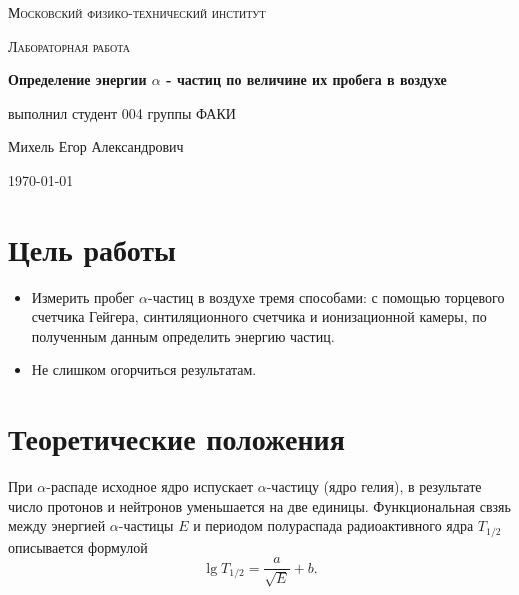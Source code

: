 \documentclass[a4paper,12pt]{article} %
\begin{document}
\begin{titlepage}
	\centering
	\vspace{5cm}
	{\scshape\LARGE Московский физико-технический институт \par}
	\vspace{4cm}
	{\scshape\Large Лабораторная работа \par}
	\vspace{1cm}
	{\huge\bfseries Определение энергии $\alpha$ - частиц по величине их пробега в воздухе \par}
	\vspace{1cm}
	\vfill
\begin{flushright}
	{\large выполнил студент 004 группы ФАКИ}\par
	\vspace{0.3cm}
	{\LARGE Михель Егор Александрович} \par

\end{flushright}
	
	\vfill

\today
\end{titlepage}


\section{Цель работы}
\begin{itemize}
    \item Измерить пробег $\alpha$-частиц в воздухе тремя способами: с помощью торцевого счетчика Гейгера, синтиляционного счетчика и ионизационной камеры, по полученным данным определить энергию частиц.
    \item Не слишком огорчиться результатам.
\end{itemize}


\section{Теоретические положения}
При $\alpha$-распаде исходное ядро испускает $\alpha$-частицу (ядро гелия), в результате число протонов и нейтронов уменьшается на две единицы. Функциональная свзяь между энергией $\alpha$-частицы $E$ и периодом полураспада радиоактивного ядра $T_{1/2}$ описывается формулой
	\begin{equation*}
		 \lg T_{1/2} = \frac{a}{\sqrt{E}} + b.
	\end{equation*}
	
\end{document}

